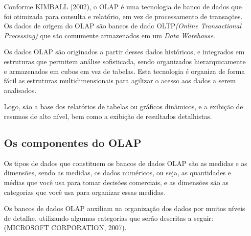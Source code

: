 Conforme KIMBALL (2002), o OLAP é uma tecnologia de banco de dados que foi otimizada para consulta e relatório, em vez de processamento de transações. Os dados de origem do OLAP são bancos de dado OLTP\textit{(Online Transactional Processing)} que são comumente armazenados em um \textit{Data Warehouse}.

Os dados OLAP são originados a partir desses dados históricos, e integrados em estruturas que permitem análise sofisticada, sendo organizados hierarquicamente e armazenados em cubos em vez de tabelas. Esta tecnologia é organiza de forma fácil as estruturas multidimensionais para agilizar o acesso aos dados a serem analisados. 

Logo, s\~{a}o a base dos relatórios de tabelas ou gráficos dinâmicos, e a exibição de resumos de alto nível, bem como a exibição de resultados detalhistas.

\subsection{Os componentes do OLAP}

Os tipos de dados que constituem os bancos de dados OLAP são as medidas e as dimensões, sendo as medidas, os dados numéricos, ou seja, as quantidades e médias que você usa para tomar decisões comerciais, e as dimensões s\~{a}o as categorias que você usa para organizar essas medidas.

Os bancos de dados OLAP auxiliam na organização dos dados por muitos níveis de detalhe, utilizando algumas categorias que serão descritas a seguir: (MICROSOFT CORPORATION, 2007).

